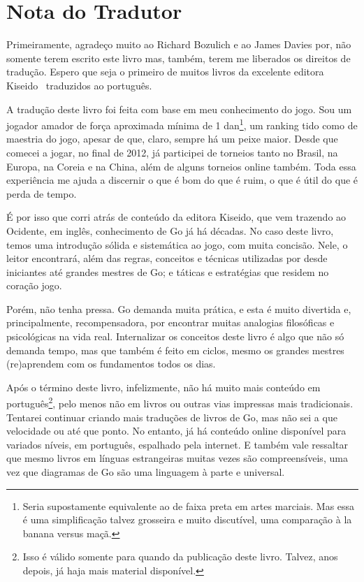 \chapter{Nota do Tradutor}

Primeiramente, agradeço muito ao Richard Bozulich e ao James Davies por, não somente terem escrito este livro mas, também, terem me liberados os direitos de tradução. Espero que seja o primeiro de muitos livros da excelente editora Kiseido~\cite{kiseido} traduzidos ao português.


\bigskip

A tradução deste livro foi feita com base em meu conhecimento do jogo. Sou um jogador amador de força aproximada mínima de 1 dan\footnote{Seria supostamente equivalente ao de faixa preta em artes marciais. Mas essa é uma simplificação talvez grosseira e muito discutível, uma comparação à la banana versus maçã.}, um ranking tido como de maestria do jogo, apesar de que, claro, sempre há um peixe maior. Desde que comecei a jogar, no final de 2012, já participei de torneios tanto no Brasil, na Europa, na Coreia e na China, além de alguns torneios online também. Toda essa experiência me ajuda a discernir o que é bom do que é ruim, o que é útil do que é perda de tempo.

É por isso que corri atrás de conteúdo da editora Kiseido, que vem trazendo ao Ocidente, em inglês, conhecimento de Go já há décadas. No caso deste livro, temos uma introdução sólida e sistemática ao jogo, com muita concisão. Nele, o leitor encontrará, além das regras, conceitos e técnicas utilizadas por desde iniciantes até grandes mestres de Go; e táticas e estratégias que residem no coração jogo.

Porém, não tenha pressa. Go demanda muita prática, e esta é muito divertida e, principalmente, recompensadora, por encontrar muitas analogias filosóficas e psicológicas na vida real. Internalizar os conceitos deste livro é algo que não só demanda tempo, mas que também é feito em ciclos, mesmo os grandes mestres (re)aprendem com os fundamentos todos os dias.

\pagebreak

Após o término deste livro, infelizmente, não há muito mais conteúdo em português\footnote{Isso é válido somente para quando da publicação deste livro. Talvez, anos depois, já haja mais material disponível.}, pelo menos não em livros ou outras vias impressas mais tradicionais. Tentarei continuar criando mais traduções de livros de Go, mas não sei a que velocidade ou até que ponto. No entanto, já há conteúdo online disponível para variados níveis, em português, espalhado pela internet. E também vale ressaltar que mesmo livros em línguas estrangeiras muitas vezes são compreensíveis, uma vez que diagramas de Go são uma linguagem à parte e universal.

